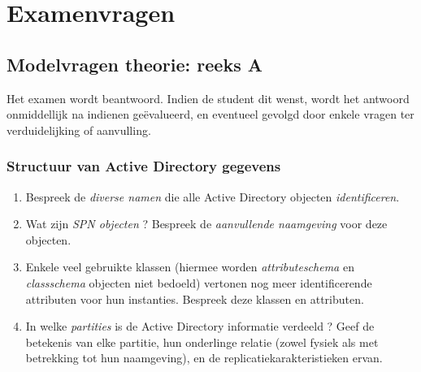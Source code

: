 \documentclass{report}
\begin{document}
	
	\part{Examenvragen}
	\chapter{Modelvragen theorie: reeks A}
	Het examen wordt  beantwoord. Indien de student dit wenst, wordt het antwoord onmiddellijk na indienen geëvalueerd, en eventueel gevolgd door enkele vragen ter verduidelijking of aanvulling.
	

	\section{Structuur van Active Directory gegevens}
	\begin{enumerate}
		\item Bespreek de \textit{diverse namen} die alle Active Directory objecten \textit{identificeren}. 
		
		\item Wat zijn \textit{SPN objecten} ? Bespreek de \textit{aanvullende naamgeving} voor deze objecten. 
		
		\item Enkele veel gebruikte klassen (hiermee worden \textit{attributeschema} en \textit{classschema} objecten niet bedoeld) vertonen nog meer identificerende attributen voor hun instanties. Bespreek deze klassen en attributen.
		
		\item In welke \textit{partities} is de Active Directory informatie verdeeld ? Geef de betekenis van elke partitie, hun onderlinge relatie (zowel fysiek als met betrekking tot hun naamgeving), en de replicatiekarakteristieken ervan. 
	\end{enumerate}
\end{document}
